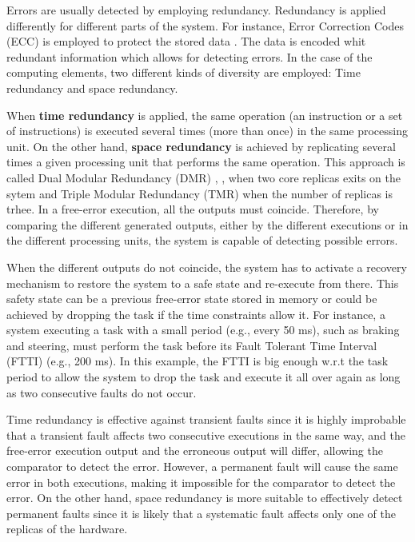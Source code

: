 Errors are usually detected by employing redundancy. Redundancy is applied differently for different parts of the system. For instance, Error Correction Codes (ECC) is employed to protect the stored data \cite{alcaide2019software}. The data is encoded whit redundant information which allows for detecting errors. In the case of the computing elements, two different kinds of diversity are employed: Time redundancy and space redundancy.

When \textbf{time redundancy} is applied, the same operation (an instruction or a set of instructions) is executed several times (more than once) in the same processing unit. On the other hand, \textbf{space redundancy} is achieved by replicating several times a given processing unit that performs the same operation. This approach is called Dual Modular Redundancy (DMR) \cite{gomaa2003transient}, \cite{lafrieda2007utilizing}, \cite{mukherjee2002detailed} when two core replicas exits on the sytem and Triple Modular Redundancy (TMR) \cite{iturbe2019arm} when the number of replicas is trhee. In a free-error execution, all the outputs must coincide. Therefore, by comparing the different generated outputs, either by the different executions or in the different processing units, the system is capable of detecting possible errors. 

When the different outputs do not coincide, the system has to activate a recovery mechanism to restore the system to a safe state and re-execute from there. This safety state can be a previous free-error state stored in memory or could be achieved by dropping the task if the time constraints allow it. For instance, a system executing a task with a small period (e.g., every 50 ms), such as braking and steering, must perform the task before its Fault Tolerant Time Interval (FTTI) (e.g., 200 ms). In this example, the FTTI is big enough w.r.t the task period to allow the system to drop the task and execute it all over again as long as two consecutive faults do not occur.

Time redundancy is effective against transient faults since it is highly improbable that a transient fault affects two consecutive executions in the same way, and the free-error execution output and the erroneous output will differ, allowing the comparator to detect the error. However, a permanent fault will cause the same error in both executions, making it impossible for the comparator to detect the error. On the other hand, space redundancy is more suitable to effectively detect permanent faults since it is likely that a systematic fault affects only one of the replicas of the hardware. 

